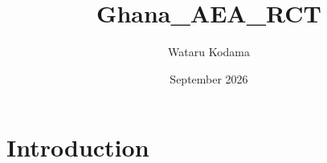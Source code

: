 \documentclass{article}
\title{Ghana_AEA_RCT}
\author{Wataru Kodama}
\date{September 2026}
\begin{document}
\maketitle

\section{Introduction}
\end{document}
